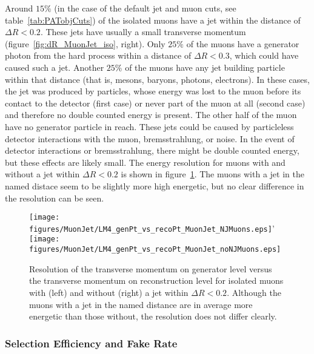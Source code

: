 \documentclass{cmspaper}
\begin{document}
Around \(15\%\) (in the case of the default jet and muon cuts, see table~\ref{tab:PATobjCuts}) of the isolated muons have a jet within the distance of \(\Delta R < 0.2\). These jets have usually a small transverse momentum (figure~\ref{fig:dR_MuonJet_iso}, right). Only \(25\%\) of the muons have a generator photon from the hard process within a distance of \(\Delta R < 0.3\), which could have caused such a jet. Another \(25\%\) of the muons have any jet building particle within that distance (that is, mesons, baryons, photons, electrons). In these cases, the jet was produced by particles, whose energy was lost to the muon before its contact to the detector (first case) or never part of the muon at all (second case) and therefore no double counted energy is present. The other half of the muon have no generator particle in reach. These jets could be caused by particleless detector interactions with the muon, bremsstrahlung, or noise. In the event of detector interactions or bremsstrahlung, there might be double counted energy, but these effects are likely small. The energy resolution for muons with and without a jet within \(\Delta R < 0.2\) is shown in figure~\ref{fig:genPt_vs_recoPt_isoMuon}. The muons with a jet in the named distace seem to be slightly more high energetic, but no clear difference in the resolution can be seen. 

\begin{figure}[hb]
\begin{center}
    \texttt{[image: figures/MuonJet/LM4\_genPt\_vs\_recoPt\_MuonJet\_NJMuons.eps]}'
    \texttt{[image: figures/MuonJet/LM4\_genPt\_vs\_recoPt\_MuonJet\_noNJMuons.eps]}
    \caption{Resolution of the transverse momentum on generator level versus the transverse momentum on reconstruction level for isolated muons with (left) and without (right) a jet within \(\Delta R < 0.2\). Although the muons with a jet in the named distance are in average more energetic than those without, the resolution does not differ clearly.}
\label{fig:genPt_vs_recoPt_isoMuon}
\end{center}
\end{figure}

\subsubsection{Selection Efficiency and Fake Rate}
\end{document}
